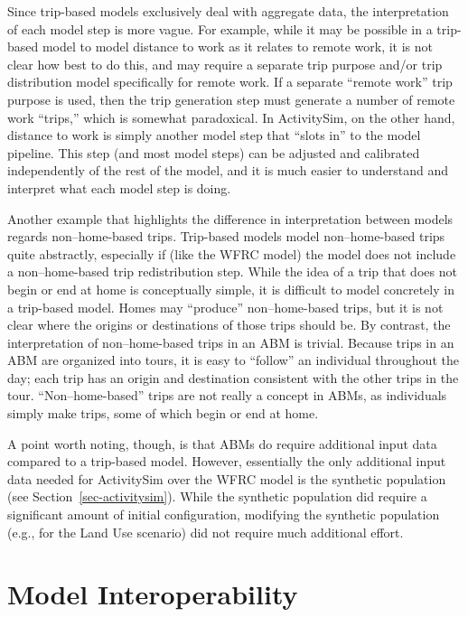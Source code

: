 \documentclass[fancy, twoside, mastersfancy, ms]{byuthesis}
\begin{document}
Since trip-based models exclusively deal with aggregate data, the
interpretation of each model step is more vague. For example, while it
may be possible in a trip-based model to model distance to work as it
relates to remote work, it is not clear how best to do this, and may
require a separate trip purpose and/or trip distribution model
specifically for remote work. If a separate ``remote work'' trip purpose
is used, then the trip generation step must generate a number of remote
work ``trips,'' which is somewhat paradoxical. In ActivitySim, on the
other hand, distance to work is simply another model step that ``slots
in'' to the model pipeline. This step (and most model steps) can be
adjusted and calibrated independently of the rest of the model, and it
is much easier to understand and interpret what each model step is
doing.

Another example that highlights the difference in interpretation between
models regards non--home-based trips. Trip-based models model
non--home-based trips quite abstractly, especially if (like the WFRC
model) the model does not include a non--home-based trip redistribution
step. While the idea of a trip that does not begin or end at home is
conceptually simple, it is difficult to model concretely in a trip-based
model. Homes may ``produce'' non--home-based trips, but it is not clear
where the origins or destinations of those trips should be. By contrast,
the interpretation of non--home-based trips in an ABM is trivial.
Because trips in an ABM are organized into tours, it is easy to
``follow'' an individual throughout the day; each trip has an origin and
destination consistent with the other trips in the tour.
``Non--home-based'' trips are not really a concept in ABMs, as
individuals simply make trips, some of which begin or end at home.

A point worth noting, though, is that ABMs do require additional input
data compared to a trip-based model. However, essentially the only
additional input data needed for ActivitySim over the WFRC model is the
synthetic population (see Section~\ref{sec-activitysim}). While the
synthetic population did require a significant amount of initial
configuration, modifying the synthetic population (e.g., for the Land
Use scenario) did not require much additional effort.

\section{Model Interoperability}\label{model-interoperability}
\end{document}
